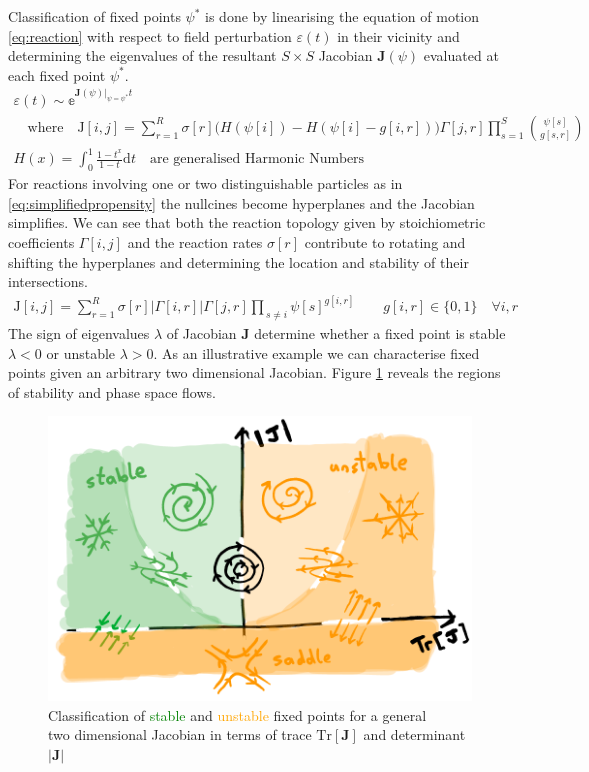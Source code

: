 \documentclass{article}[12pt]
\numberwithin{equation}{section}
\begin{document}
Classification of fixed points $\psi^*$ is done by linearising the equation of motion
\eqref{eq:reaction} with respect to field perturbation $\varepsilon(t)$ in their vicinity
and determining the eigenvalues of the resultant $S\times S$ Jacobian $\mathbf{J}(\psi)$
evaluated at each fixed point $\psi^*$.
\begin{align}
	\varepsilon(t) \sim
	\mathbb{e}^{\mathbf{J}(\psi)|_{\psi=\psi^*}t}\qquad\qquad\qquad\qquad\qquad\qquad
	\\
	\quad\text{where}\quad
	\mathrm{J}[i,j]=
	\sum_{r=1}^R
	\sigma[r]
\bigg(H(\psi[i])-H(\psi[i]-g[i,r])\bigg)
	\Gamma[j,r]
		\prod_{s=1}^S{\psi[s] \choose g[s,r]}
	\\
	H(x)=\int_0^1\frac{1-t^x}{1-t}\mathrm{d}t\quad
	\text{are generalised Harmonic Numbers}\qquad
	\label{eq:linearstability}
\end{align}
For reactions involving one or two distinguishable particles as
in \eqref{eq:simplifiedpropensity} the nullcines become hyperplanes and the Jacobian
simplifies. We can see that both the reaction topology given by stoichiometric
coefficients $\Gamma[i,j]$ and the reaction rates $\sigma[r]$ contribute to
rotating and shifting the hyperplanes and determining the location and stability
of their intersections.
\begin{align}
	\mathrm{J}[i,j]=
	\sum_{r=1}^R
		\sigma[r]|\Gamma[i,r]|\Gamma[j,r]
		\prod_{\,s\neq i}
		\psi[s]^{g[i,r]}
		\qquad g[i,r]\in\{0,1\} \quad\forall i,r
	\label{eq:simplifiedjacobian}
\end{align}
The sign of eigenvalues $\lambda$ of Jacobian $\mathbf{J}$ determine whether a fixed point
is stable $\lambda<0$ or unstable $\lambda>0$. As an illustrative example we can characterise
fixed points given an arbitrary two dimensional Jacobian. Figure \ref{fig:stability} reveals
the regions of stability and phase space flows.
\begin{figure}[H]
\centering{}
\captionsetup{justification=centering}
\includegraphics[scale=0.35]{figures/stability}
\caption{Classification of \textcolor{Green}{stable} and \textcolor{orange}{unstable}
fixed points for a general \\two dimensional Jacobian in terms of trace $\mathrm{Tr}[\mathbf{J}]$ and
determinant $|\mathbf{J}|$}
\label{fig:stability}
\end{figure}
\end{document}
